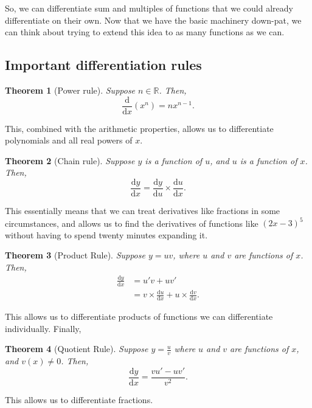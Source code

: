 \documentclass[a4paper,11pt]{article}
\newcommand{\R}{\mathbb{R}}
\newcommand{\diff}[2]{\frac{\mathrm{d}#1}{\mathrm{d}#2}}
\newtheorem*{theorem*}{Theorem}
\begin{document}
	\noindent So, we can differentiate sum and multiples of functions that we could already differentiate on their own. Now that we have the basic machinery down-pat, we can think about trying to extend this idea to as many functions as we can.
	
	\subsection{Important differentiation rules}
	\begin{theorem*}[Power rule]
		Suppose $n\in\R$. Then,
		$$
		\diff{}{x}\left(x^n\right) = nx^{n-1}.
		$$
	\end{theorem*}
	This, combined with the arithmetic properties, allows us to differentiate polynomials and all real powers of $x$.
	\begin{theorem*}[Chain rule]
		Suppose $y$ is a function of $u$, and $u$ is a function of $x$. Then,
		$$
		\diff{y}{x} = \diff{y}{u}\times\diff{u}{x}.
		$$
	\end{theorem*}
	This essentially means that we can treat derivatives like fractions in some circumstances, and allows us to find the derivatives of functions like $(2x-3)^5$ without having to spend twenty minutes expanding it.
	\begin{theorem*}[Product Rule]
		Suppose $y = uv$, where $u$ and $v$ are functions of $x$. Then,
		\begin{align*}
		\diff{y}{x} &= u'v+uv'\\
		&= v\times\diff{u}{x}+u\times\diff{v}{x}.
		\end{align*}
	\end{theorem*}
	This allows us to differentiate products of functions we can differentiate individually. Finally,
	\begin{theorem*}[Quotient Rule]
		Suppose $y=\frac{u}{v}$ where $u$ and $v$ are functions of $x$, and $v(x)\neq 0$. Then,
		$$
		\diff{y}{x} = \frac{vu'-uv'}{v^2}.
		$$
	\end{theorem*}
	This allows us to differentiate fractions.\\
	
\end{document}
